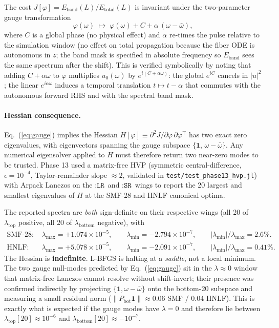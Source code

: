\documentclass[11pt]{article}
\begin{document}
The cost
\(J[\varphi] = E_\text{band}(L)/E_\text{total}(L)\) is invariant under the
two-parameter gauge transformation
\begin{equation}
  \varphi(\omega) \;\mapsto\; \varphi(\omega) + C + \alpha\,(\omega - \bar\omega),
  \label{eq:gauge}
\end{equation}
where $C$ is a global phase (no physical effect) and $\alpha$ re-times the
pulse relative to the simulation window (no effect on total propagation
because the fiber ODE is autonomous in $z$; the band mask is specified in
absolute frequency so $E_\text{band}$ sees the same spectrum after the shift).
This is verified symbolically by noting that adding $C + \alpha\omega$ to
$\varphi$ multiplies $u_0(\omega)$ by $e^{i(C + \alpha\omega)}$: the global
$e^{iC}$ cancels in $|u|^2$; the linear $e^{i\alpha\omega}$ induces a temporal
translation $t \mapsto t - \alpha$ that commutes with the autonomous forward
RHS and with the spectral band mask.

\paragraph{Hessian consequence.}
Eq.~(\ref{eq:gauge}) implies the Hessian
$H[\varphi] \equiv \partial^2 J / \partial\varphi\,\partial\varphi^\top$
has two exact zero eigenvalues, with eigenvectors spanning the gauge
subspace $\{\mathbf{1},\, \omega - \bar\omega\}$. Any numerical eigensolver
applied to $H$ must therefore return two near-zero modes to be trusted.
Phase 13 used a matrix-free HVP (symmetric central-difference,
$\epsilon = 10^{-4}$, Taylor-remainder slope $\approx 2$, validated in
\texttt{test/test\_phase13\_hvp.jl}) with Arpack Lanczos on the
$:\texttt{LR}$ and $:\texttt{SR}$ wings to report the 20 largest and
smallest eigenvalues of $H$ at the SMF-28 and HNLF canonical optima.

The reported spectra are \emph{both} sign-definite on their respective wings
(all 20 of $\lambda_\text{top}$ positive, all 20 of $\lambda_\text{bottom}$
negative), with
\begin{align*}
  \text{SMF-28:}\quad & \lambda_\text{max} = +1.074\times10^{-5}, \qquad
                        \lambda_\text{min} = -2.794\times10^{-7},\qquad
                        |\lambda_\text{min}|/\lambda_\text{max} = 2.6\%. \\
  \text{HNLF:}\quad & \lambda_\text{max} = +5.078\times10^{-5}, \qquad
                       \lambda_\text{min} = -2.091\times10^{-7},\qquad
                       |\lambda_\text{min}|/\lambda_\text{max} = 0.41\%.
\end{align*}
The Hessian is \textbf{indefinite}. L-BFGS is halting at a \emph{saddle}, not
a local minimum. The two gauge null-modes predicted by
Eq.~(\ref{eq:gauge}) sit in the $\lambda \approx 0$ window that matrix-free
Lanczos cannot resolve without shift-invert; their presence was confirmed
indirectly by projecting $\{\mathbf{1},\omega-\bar\omega\}$ onto the
bottom-20 subspace and measuring a small residual norm
($\lVert P_\text{bot}\mathbf{1}\rVert \approx 0.06$ SMF / $0.04$ HNLF). This
is exactly what is expected if the gauge modes have $\lambda = 0$ and
therefore lie between $\lambda_\text{top}[20] \approx 10^{-6}$ and
$\lambda_\text{bottom}[20] \approx -10^{-7}$.
\end{document}
